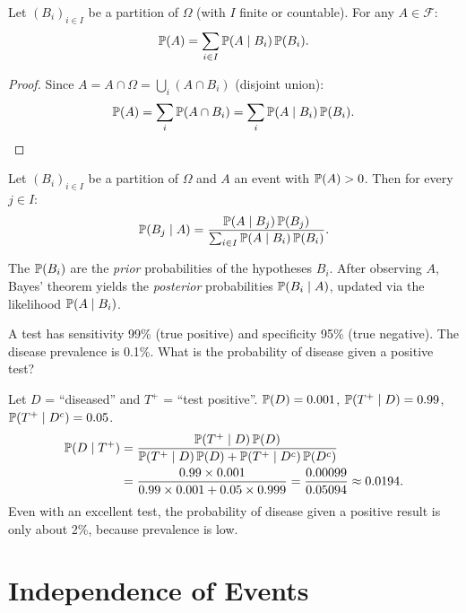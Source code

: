 \begin{theorem}
\label{thm:total_prob}
Let $(B_i)_{i \in I}$ be a partition of $\Omega$ (with $I$ finite or countable).
For any $A \in \mathcal{F}$:
\[
    \mathbb{P}(A) = \sum_{i \in I} \mathbb{P}(A \mid B_i)\,\mathbb{P}(B_i).
\]
\end{theorem}

\begin{proof}
Since $A = A \cap \Omega = \bigcup_i (A \cap B_i)$ (disjoint union):
\[
    \mathbb{P}(A) = \sum_i \mathbb{P}(A \cap B_i) = \sum_i \mathbb{P}(A \mid B_i)\,\mathbb{P}(B_i). \qedhere
\]
\end{proof}

\begin{theorem}
\label{thm:bayes}
Let $(B_i)_{i \in I}$ be a partition of $\Omega$ and $A$ an event with
$\mathbb{P}(A) > 0$. Then for every $j \in I$:
\[
    \PP(B_j \mid A) = \frac{\PP(A \mid B_j)\,\PP(B_j)}%
    {\sum_{i \in I} \PP(A \mid B_i)\,\PP(B_i)}.
\]
\end{theorem}

\begin{intuition}[title=\textbf{Bayesian interpretation}]
The $\mathbb{P}(B_i)$ are the \emph{prior} probabilities of the hypotheses $B_i$.
After observing $A$, Bayes' theorem yields the \emph{posterior} probabilities
$\mathbb{P}(B_i \mid A)$, updated via the likelihood $\mathbb{P}(A \mid B_i)$.
\end{intuition}

\begin{example}
A test has sensitivity 99\% (true positive) and specificity 95\% (true negative).
The disease prevalence is 0.1\%. What is the probability of disease given a
positive test?

Let $D$ = ``diseased'' and $T^+$ = ``test positive''.
$\mathbb{P}(D) = 0.001$, $\mathbb{P}(T^+ \mid D) = 0.99$, $\mathbb{P}(T^+ \mid D^c) = 0.05$.
\begin{align*}
    \PP(D \mid T^+)
    &= \frac{\PP(T^+ \mid D)\,\PP(D)}%
    {\PP(T^+ \mid D)\,\PP(D) + \PP(T^+ \mid D^c)\,\PP(D^c)} \\
    &= \frac{0.99 \times 0.001}{0.99 \times 0.001 + 0.05 \times 0.999}
    = \frac{0.00099}{0.05094}
    \approx 0.0194.
\end{align*}
Even with an excellent test, the probability of disease given a positive result is
only about 2\%, because prevalence is low.
\end{example}

\section{Independence of Events}

